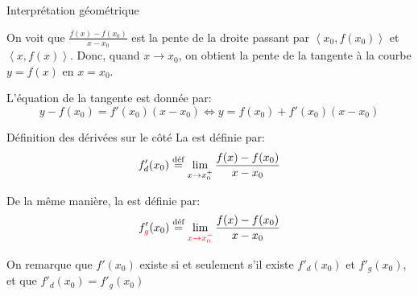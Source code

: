 \documentclass[a4paper]{article}
\begin{document}
\begin{parag}{Interprétation géométrique}

    On voit que $\frac{f\left(x\right) - f\left(x_0\right)}{x - x_0}$ est la pente de la droite passant par $\left<x_0, f\left(x_0\right)\right>$ et $\left<x, f\left(x\right)\right>$. Donc, quand $x \to x_0$, on obtient la pente de la tangente à la courbe $y = f\left(x\right)$ en $x = x_0$.

    L'équation de la tangente est donnée par:
    \[y - f\left(x_0\right) = f'\left(x_0\right)\left(x - x_0\right) \iff y = f\left(x_0\right) + f'\left(x_0\right)\left(x - x_0\right)\]
\end{parag}

\begin{parag}{Définition des dérivées sur le côté}
    La  est définie par:
    \[f'_d\left(x_0\right) \over{=}{déf}  \lim_{x \to x_0^+} \frac{f\left(x\right) - f\left(x_0\right)}{x - x_0}\]

    De la même manière, la  est définie par:
    \[f'_{{\color{red}g}}\left(x_0\right) \over{=}{déf} \lim_{{\color{red}x \to x_0^-}} \frac{f\left(x\right) - f\left(x_0\right)}{x - x_0} \]

    On remarque que $f'\left(x_0\right)$ existe si et seulement s'il existe $f'_d\left(x_0\right)$ et $f'_g\left(x_0\right)$, et que $f'_d\left(x_0\right) = f'_g\left(x_0\right)$
\end{parag}
\end{document}
